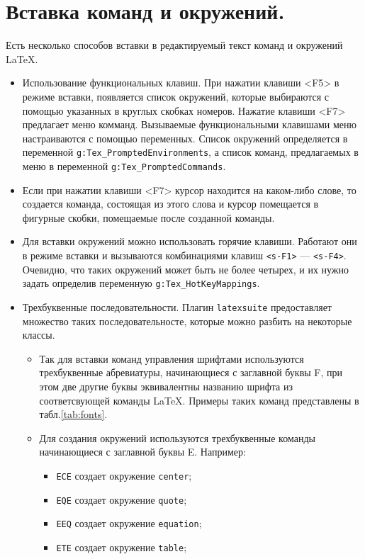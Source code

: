 \documentclass[a4paper]{article}
\begin{document}
\part{Вставка команд и окружений.}\label{part:insert}
Есть несколько способов вставки в редактируемый текст команд и окружений \LaTeX.
\begin{itemize}
	\item\sloppy Использование функциональных клавиш. При нажатии клавиши <F5> в режиме
		вставки, появляется список окружений, которые выбираются с помощью 
		указанных в круглых скобках номеров. Нажатие клавиши <F7> предлагает 
		меню комманд. Вызываемые функциональными клавишами меню настраиваются с
		помощью переменных. Список окружений определяется в переменной \verb|g:Tex_PromptedEnvironments|,
		а список команд, предлагаемых в меню в переменной 
		\verb|g:Tex_PromptedCommands|.
	\item Если при нажатии клавиши <F7> курсор находится на каком-либо слове, 
		то создается команда, состоящая из этого слова и курсор помещается в
		фигурные скобки, помещаемые после созданной команды. 
	\item Для вставки окружений можно использовать горячие клавиши. Работают они 
		в режиме вставки и вызываются комбинациями клавиш \texttt{<s-F1>} --- \texttt{<s-F4>}.
		Очевидно, что таких окружений может быть не более четырех, и их нужно 
		задать определив переменную \verb|g:Tex_HotKeyMappings|.
	\item Трехбуквенные последовательности. Плагин \texttt{latexsuite} предоставляет
		множество таких последовательносте, которые можно разбить на некоторые классы.
		\begin{itemize}
			\item 
		Так для вставки команд управления шрифтами 
		используются трехбуквенные абревиатуры, начинающиеся с заглавной буквы F, при
		этом две другие буквы эквивалентны названию шрифта из соответсвующей команды 
		\LaTeX. Примеры таких команд представлены в табл.\ref{tab:fonts}.
			\item Для создания окружений используются трехбуквенные команды начинающиеся
				с заглавной буквы E. Например:
			  \begin{itemize}
				  \item \texttt{ECE} создает окружение \verb|center|;
				  \item \texttt{EQE} создает окружение \verb|quote|;
				  \item \texttt{EEQ} создает окружение \verb|equation|;
				  \item \texttt{ETE} создает окружение \verb|table|;

\end{itemize}
\end{itemize}
\end{itemize}
\end{document}
